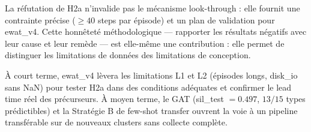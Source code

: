 \documentclass[12pt, a4paper]{article}
\begin{document}
La réfutation de H2a n'invalide pas le mécanisme look-through : elle fournit une
contrainte précise ($\geq 40$ steps par épisode) et un plan de validation pour ewat\_v4.
Cette honnêteté méthodologique — rapporter les résultats négatifs avec leur cause
et leur remède — est elle-même une contribution : elle permet de distinguer les
limitations de données des limitations de conception.

À court terme, ewat\_v4 lèvera les limitations L1 et L2 (épisodes longs, disk\_io sans NaN)
pour tester H2a dans des conditions adéquates et confirmer le lead time réel des précurseurs.
À moyen terme, le GAT (sil\_test $= 0.497$, $13/15$ types prédictibles) et la Stratégie B
de few-shot transfer ouvrent la voie à un pipeline transférable sur de nouveaux clusters
sans collecte complète.


\printbibliography[heading=bibintoc, title={Références}]
\end{document}
